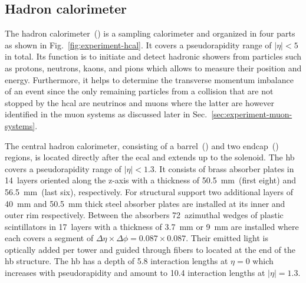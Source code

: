 \subsection{Hadron calorimeter}

The hadron calorimeter~() is a sampling calorimeter and organized in four parts as shown in Fig.~\ref{fig:experiment-hcal}. It covers a pseudorapidity range of $|\eta|<5$ in total. Its function is to initiate and detect hadronic showers from particles such as protons, neutrons, kaons, and pions which allows to measure their position and energy. Furthermore, it helps to determine the transverse momentum imbalance of an event since the only remaining particles from a collision that are not stopped by the \gls{hcal} are neutrinos and muons where the latter are however identified in the muon systems as discussed later in Sec.~\ref{sec:experiment-muon-systems}.


The central hadron calorimeter, consisting of a barrel~() and two endcap~() regions, is located directly after the \gls{ecal} and extends up to the solenoid. The \gls{hb} covers a pseudorapidity range of $|\eta|<1.3$. It consists of brass absorber plates in 14~layers oriented along the z-axis with a thickness of 50.5~mm~(first eight) and 56.5~mm~(last six), respectively. For structural support two additional layers of 40~mm and 50.5~mm thick steel absorber plates are installed at its inner and outer rim respectively. Between the absorbers 72~azimuthal wedges of plastic scintillators in 17~layers with a thickness of 3.7~mm or 9~mm are installed where each covers a segment of $\Delta\eta\times\Delta\phi=0.087\times0.087$. Their emitted light is optically added per tower and guided through  fibers to  located at the end of the \gls{hb} structure. The \gls{hb} has a depth of 5.8 interaction lengths at $\eta=0$ which increases with pseudorapidity and amount to 10.4 interaction lengths at $|\eta|=1.3$. 

